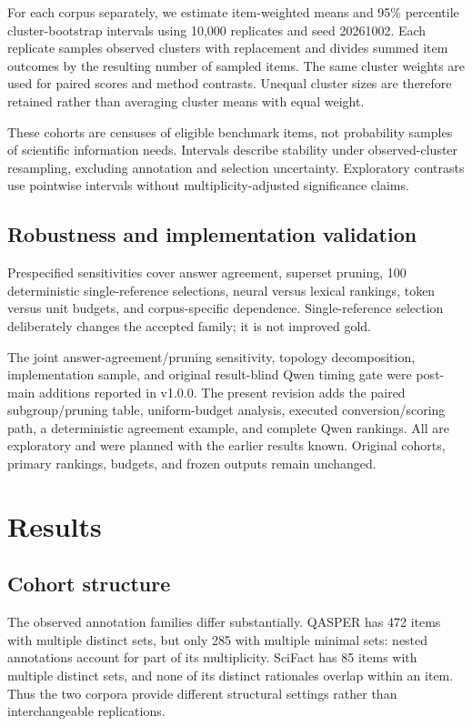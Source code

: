 \documentclass[twoside,a4paper,11pt]{article}
\begin{document}
For each corpus separately, we estimate item-weighted means and 95\% percentile cluster-bootstrap intervals using 10,000 replicates and seed 20261002. Each replicate samples observed clusters with replacement and divides summed item outcomes by the resulting number of sampled items. The same cluster weights are used for paired scores and method contrasts. Unequal cluster sizes are therefore retained rather than averaging cluster means with equal weight.

These cohorts are censuses of eligible benchmark items, not probability samples of scientific information needs. Intervals describe stability under observed-cluster resampling, excluding annotation and selection uncertainty. Exploratory contrasts use pointwise intervals without multiplicity-adjusted significance claims.


\subsection{Robustness and implementation validation}
Prespecified sensitivities cover answer agreement, superset pruning, 100 deterministic single-reference selections, neural versus lexical rankings, token versus unit budgets, and corpus-specific dependence. Single-reference selection deliberately changes the accepted family; it is not improved gold.

The joint answer-agreement/pruning sensitivity, topology decomposition, implementation sample, and original result-blind Qwen timing gate were post-main additions reported in v1.0.0. The present revision adds the paired subgroup/pruning table, uniform-budget analysis, executed conversion/scoring path, a deterministic agreement example, and complete Qwen rankings. All are exploratory and were planned with the earlier results known. Original cohorts, primary rankings, budgets, and frozen outputs remain unchanged.


\section{Results}

\subsection{Cohort structure}
The observed annotation families differ substantially. QASPER has 472 items with multiple distinct sets, but only 285 with multiple minimal sets: nested annotations account for part of its multiplicity. SciFact has 85 items with multiple distinct sets, and none of its distinct rationales overlap within an item. Thus the two corpora provide different structural settings rather than interchangeable replications.
\end{document}
